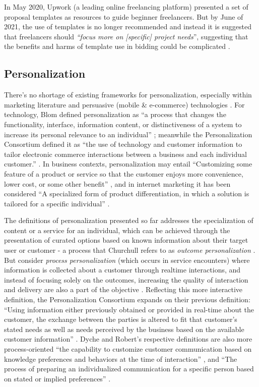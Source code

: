 In May 2020, Upwork (a leading online freelancing platform) presented a set of proposal templates as resources to guide beginner freelancers. But by June of 2021, the use of templates is no longer recommended and instead it is suggested that freelancers should \textit{``focus more on [specific] project needs}'', suggesting that the benefits and harms of template use in bidding could be complicated \cite{noauthor_undated-wy}.

\subsection{Personalization}
There's no shortage of existing frameworks for personalization, especially within marketing literature and persuasive  (mobile \& e-commerce) technologies \cite{fan2006personalization, zhang2007toward}. For technology, Blom defined personalization as ``a process that changes the functionality, interface, information content, or distinctiveness of a system to increase its personal relevance to an individual'' \cite{Blom_2000}; meanwhile the Personalization Consortium defined it as ``the use of technology and customer information to tailor electronic commerce interactions between a business and each individual customer.'' \cite{consortium}. In business contexts, personalization may entail ``Customizing some feature of a product or service so that the customer enjoys more convenience, lower cost, or some other benefit'' \cite{peppers}, and in internet marketing it has been considered ``A specialized form of product differentiation, in which a solution is tailored for a specific individual'' \cite{hanson2000principles}.

The definitions of personalization presented so far addresses the specialization of content or a service for an individual, which can be achieved through the presentation of curated options based on known information about their target user or customer - a process that Churchull refers to as \textit{outcome personalization} \cite{Churchill_2013}. But consider \textit{process personalization} (which occurs in service encounters) where information is collected about a customer through realtime interactions, and instead of focusing solely on the outcomes, increasing the quality of interaction and delivery are also a part of the objective \cite{Churchill_2013}. Reflecting this more interactive definition, the Personalization Consortium expands on their previous definition: ``Using information either previously obtained or provided in real-time about the customer, the exchange between the parties is altered to fit that customer's stated needs as well as needs perceived by the business based on the available customer information'' \cite{consortium}. Dyche and Robert's respective definitions are also more process-oriented ``the capability to customize customer communication based on knowledge preferences and behaviors at the time of interaction'' \cite{roberts2012internet}, and ``The process of preparing an individualized communication for a specific person based on stated or implied preferences'' \cite{dyche2002crm}. 


